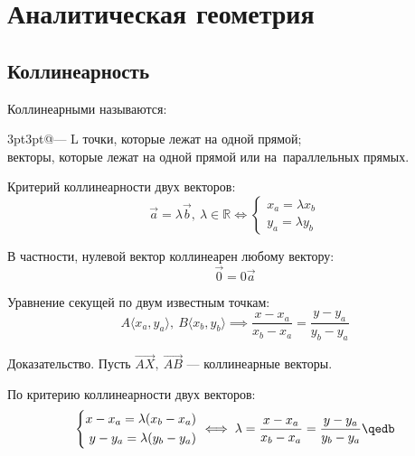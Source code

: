 \section{Аналитическая геометрия}

\subsection{Коллинеарность}

{\bold Коллинеарными} называются:
\begin{tabularcx}{3pt}{3pt}{@{--- } L}{\textwidth}
{\ital точки}, которые лежат на одной прямой;\\
{\ital векторы}, которые лежат на одной прямой или на~параллельных прямых.
\end{tabularcx}
\begin{theorem}
{\bold Критерий коллинеарности} двух векторов:
$$\overrightarrow{a}=\lambda\overrightarrow{b},\ \lambda\in\mathbb{R}\iff\begin{cases}
x_a=\lambda x_b\\
y_a=\lambda y_b
\end{cases}$$ 
\end{theorem}
В частности, нулевой вектор коллинеарен {\ital любому} вектору:
$$\overrightarrow{0}=0\overrightarrow{a}$$
\begin{theorem}
{\bold Уравнение секущей} по двум известным точкам:
$$A\langle x_a,y_a\rangle,\ B\langle x_b,y_b\rangle\implies\frac{x-x_a}{x_b-x_a}=\frac{y-y_a}{y_b-y_a}$$
\end{theorem}
{\bold Доказательство.} Пусть $\overrightarrow{AX},\ \overrightarrow{AB}$ --- коллинеарные векторы.

По критерию коллинеарности двух векторов:
$$\left\{\begin{aligned}
x-x_a=\lambda(x_b-x_a)\\
y-y_a=\lambda(y_b-y_a)
\end{aligned}\right.\iff
\lambda=\frac{x-x_a}{x_b-x_a}=\frac{y-y_a}{y_b-y_a}\qedb$$
